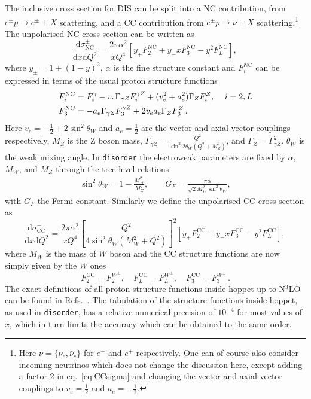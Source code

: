 \documentclass[submission, PhysCodeb]{SciPost_better_arXiv}
\newcommand{\hoppet}{{\sc hoppet}}
\newcommand{\disorder}{{\tt disorder}}
\newcommand{\dd}{\mathrm{d}}
\newcommand{\NC}{\mathrm{NC}}
\newcommand{\CC}{\mathrm{CC}}
\newcommand{\NNNLO}{N$^3$LO}
\begin{document}
The inclusive cross section for DIS can be split into a NC
contribution, from $e^\pm p \to e^\pm + X$ scattering, and a CC
contribution from $e^\pm p \to \nu + X$ scattering.\footnote{Here
$\nu=\{\nu_e,\bar{\nu}_e\}$ for $e^-$ and $e^+$ respectively. One can
of course also consider incoming neutrinos which does not change the
discussion here, except adding a factor $2$ in eq.~\eqref{eq:CCsigma}
and changing the vector and axial-vector couplings to $v_e = \frac12$
and $a_e=-\frac12$.} The unpolarised NC cross section can
be written as
\begin{equation}
\frac{\dd\sigma_{\NC}^\pm}{\dd x \dd Q^2} =   \frac{2\pi\alpha^2}{xQ^4} \left[y_+ F_2^{\NC} \mp y_- x F_3^\NC - y^2 F_L^\NC\right],\,
\label{eq:NCsigma}
\end{equation}
where $y_\pm=1\pm(1-y)^2$, $\alpha$ is the fine structure constant and
$F_i^\NC$ can be expressed in terms of the usual proton structure
functions
\begin{align}
  F_{i}^\NC &= F_{i}^\gamma  - v_e \Gamma_{\gamma Z} F_{i}^{\gamma Z} + (v_e^2 + a_e^2)\Gamma_{Z} F_{i}^{Z},\, \quad i =2,L \\ \notag
  F_{3}^\NC &= - a_e \Gamma_{\gamma Z} F_{3}^{\gamma Z} + 2v_e a_e\Gamma_{Z} F_{3}^{Z}\,.
\end{align}
Here $v_e = -\frac12 + 2 \sin^2\theta_W$ and $a_e=\frac12$ are the
vector and axial-vector couplings respectively, $M_Z$ is the Z boson
mass, $\Gamma_{\gamma Z} = \frac{Q^2}{\sin^2 2\theta_W(Q^2+M_Z^2)}$,
and $\Gamma_Z=\Gamma_{\gamma Z}^2$. $\theta_W$ is the weak mixing
angle. In \disorder{} the electroweak parameters are fixed by
$\alpha$, $M_W$, and $M_Z$ through the tree-level relations
\begin{align}
  \sin^2\theta_W = 1-\frac{M_W^2}{M_Z^2}, \qquad G_F = \frac{\pi\alpha}{\sqrt{2}M_W^2\sin^2\theta_W},
\end{align}
with $G_F$ the Fermi constant. Similarly we define the unpolarised CC
cross section as
\begin{equation}
\frac{\dd\sigma_{\CC}^\pm}{\dd x \dd Q^2} =   \frac{2\pi\alpha^2}{xQ^4}\left[\frac{Q^2}{4\sin^2\theta_W(M_W^2 + Q^2)}\right]^2 \left[y_+ F_2^{\CC} \mp y_- x F_3^\CC - y^2 F_L^\CC\right],\,
\label{eq:CCsigma}
\end{equation}
where $M_W$ is the mass of $W$ boson and the CC structure functions
are now simply given by the $W$ ones
\begin{equation}
  F_2^\CC = F_2^{W^\pm}, \quad   F_L^\CC = F_L^{W^\pm}, \quad   F_3^\CC = F_3^{W^\pm}\,.
\end{equation}
The exact definitions of all proton structure functions inside
\hoppet{} up to \NNNLO{} can be found in
Refs.~\cite{Salam:2008qg,hoppetv130,BertoneKarlberg}. The tabulation of the
structure functions inside \hoppet{}, as used in \disorder{}, has a
relative numerical precision of $10^{-4}$ for most values of $x$,
which in turn limits the accuracy which can be obtained to the same
order.
\end{document}
